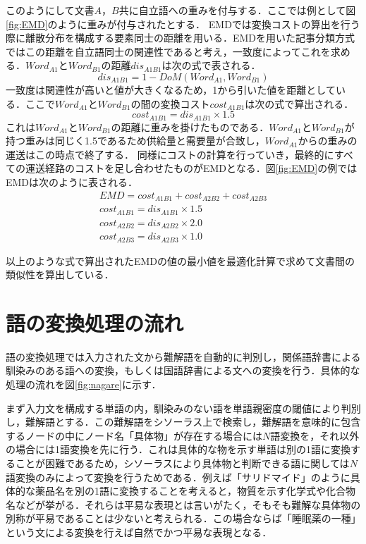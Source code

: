 \documentclass[japanese]{jnlp_1.4}
\begin{document}
このようにして文書$A，B$共に自立語への重みを付与する．ここでは例として図\ref{fig:EMD}のように重みが付与されたとする．
EMDでは変換コストの算出を行う際に離散分布を構成する要素同士の距離を用いる．EMDを用いた記事分類方式ではこの距離を自立語同士の関連性であると考え，一致度によってこれを求める．$\mathit{Word}_{A1}$と$\mathit{Word}_{B1}$の距離$\mathit{dis}_{A1B1}$は次の式で表される．
\begin{equation}
 \mathit{dis}_{A1B1}=1-\mathit{DoM}(\mathit{Word}_{A1}, \mathit{Word}_{B1})
\end{equation}
一致度は関連性が高いと値が大きくなるため，1から引いた値を距離としている．ここで$\mathit{Word}_{A1}$と$\mathit{Word}_{B1}$の間の変換コスト$\mathit{cost}_{A1B1}$は次の式で算出される．
\begin{equation}
 \mathit{cost}_{A1B1}=\mathit{dis}_{A1B1}{\times}1.5
\end{equation}
これは$\mathit{Word}_{A1}$と$\mathit{Word}_{B1}$の距離に重みを掛けたものである．$\mathit{Word}_{A1}$と$\mathit{Word}_{B1}$が持つ重みは同じく1.5であるため供給量と需要量が合致し，$\mathit{Word}_{A1}$からの重みの運送はこの時点で終了する．
同様にコストの計算を行っていき，最終的にすべての運送経路のコストを足し合わせたものがEMDとなる．図\ref{fig:EMD}の例ではEMDは次のように表される．
\begin{gather}
 \mathit{EMD}= \mathit{cost}_{A1B1}+ \mathit{cost}_{A2B2}+ \mathit{cost}_{A2B3} \\
 \mathit{cost}_{A1B1}=\mathit{dis}_{A1B1}{\times}1.5 \\
 \mathit{cost}_{A2B2}=\mathit{dis}_{A2B2}{\times}2.0 \\
 \mathit{cost}_{A2B3}=\mathit{dis}_{A2B3}{\times}1.0
\end{gather}

以上のような式で算出されたEMDの値の最小値を最適化計算で求めて文書間の類似性を算出している．


\section{語の変換処理の流れ}
\label{nagarezu}

語の変換処理では入力された文から難解語を自動的に判別し，関係語辞書\cite{Article_10,Article_11}による馴染みのある語への変換，もしくは国語辞書による文への変換を行う．具体的な処理の流れを図\ref{fig:nagare}に示す．

まず入力文を構成する単語の内，馴染みのない語を単語親密度の閾値により判別し，難解語とする．この難解語をシソーラス\cite{Book_02}上で検索し，難解語を意味的に包含するノードの中にノード名「具体物」が存在する場合には$N$語変換を，それ以外の場合には1語変換を先に行う．これは具体的な物を示す単語は別の1語に変換することが困難であるため，シソーラスにより具体物と判断できる語に関しては$N$語変換のみによって変換を行うためである．例えば「サリドマイド」のように具体的な薬品名を別の1語に変換することを考えると，物質を示す化学式や化合物名などが挙がる．それらは平易な表現とは言いがたく，そもそも難解な具体物の別称が平易であることは少ないと考えられる．この場合ならば「睡眠薬の一種」という文による変換を行えば自然でかつ平易な表現となる．
\end{document}
